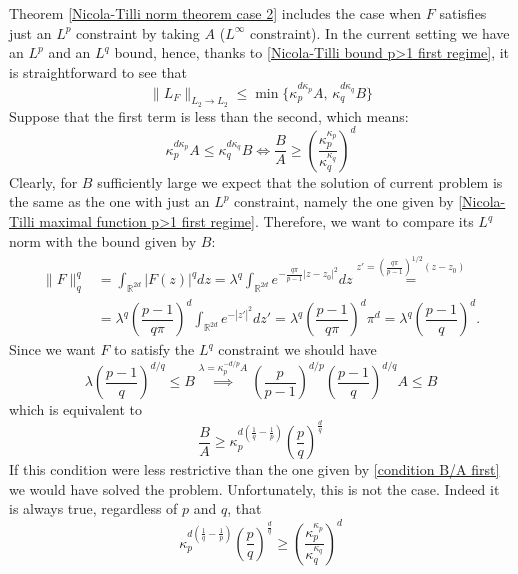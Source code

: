 \documentclass[corpo=11pt, stile=classica, tipotesi=custom,
greek, evenboxes, english]{toptesi}
\numberwithin{equation}{chapter}
\theoremstyle{remark}
\newcommand{\R}{\mathbb{R}} %
\begin{document}
Theorem \ref{Nicola-Tilli norm theorem case 2} includes the case when $F$ satisfies just an $L^p$ constraint by taking $A$ ($L^{\infty}$ constraint). In the current setting we have an $L^p$ and an $L^q$ bound, hence, thanks to \ref{Nicola-Tilli bound p>1 first regime}, it is straightforward to see that
\begin{equation*}
	\| L_F\|_{L_2 \rightarrow L_2} \leq \min\{\kappa_p^{d\kappa_p}A, \, \kappa_q^{d\kappa_q}B\}
\end{equation*}
Suppose that the first term is less than the second, which means:
\begin{equation}\label{condition B/A first}
	\kappa_p^{d\kappa_p}A \leq \kappa_q^{d\kappa_q}B \iff \dfrac{B}{A} \geq \left(\dfrac{\kappa_p^{\kappa_p}}{\kappa_q^{\kappa_q}}\right)^d
\end{equation}
Clearly, for $B$ sufficiently large we expect that the solution of current problem is the same as the one with just an $L^p$ constraint, namely the one given by \eqref{Nicola-Tilli maximal function p>1 first regime}. Therefore, we want to compare its $L^q$ norm with the bound given by $B$:
\begin{align*}
	\| F \|_q^q &= \int_{\R^{2d}} |F(z)|^q dz = \lambda^q \int_{\R^{2d}} e^{-\frac{q\pi}{p-1}|z-z_0|^2} dz \overset{z' = \left(\frac{q\pi}{p-1}\right)^{1/2}(z-z_0)}{=}\\
	&= \lambda^q \left(\dfrac{p-1}{q\pi}\right)^d \int_{\R^{2d}} e^{-|z'|^2}dz' = \lambda^q \left(\dfrac{p-1}{q\pi}\right)^d \pi^d = \lambda^q \left(\dfrac{p-1}{q}\right)^d.
\end{align*}
Since we want $F$ to satisfy the $L^q$ constraint we should have
\begin{equation*}
	\lambda \left(\dfrac{p-1}{q}\right)^{d/q} \leq B \overset{\lambda = \kappa_p^{-d/p}A}{\implies} \left(\dfrac{p}{p-1}\right)^{d/p} \left(\dfrac{p-1}{q}\right)^{d/q}A \leq B
\end{equation*}
which is equivalent to
\begin{equation*}\label{condition B/A second}
	\dfrac{B}{A} \geq \kappa_p^{d\left(\frac1q - \frac1p\right)}\left(\dfrac{p}{q}\right)^{\frac{d}{q}}
\end{equation*}
If this condition were less restrictive than the one given by \eqref{condition B/A first} we would have solved the problem. Unfortunately, this is not the case. Indeed it is always true, regardless of $p$ and $q$, that
\begin{equation*}
	\kappa_p^{d\left(\frac1q - \frac1p\right)}\left(\dfrac{p}{q}\right)^{\frac{d}{q}} \geq \left(\dfrac{\kappa_p^{\kappa_p}}{\kappa_q^{\kappa_q}}\right)^d
\end{equation*}
\end{document}
